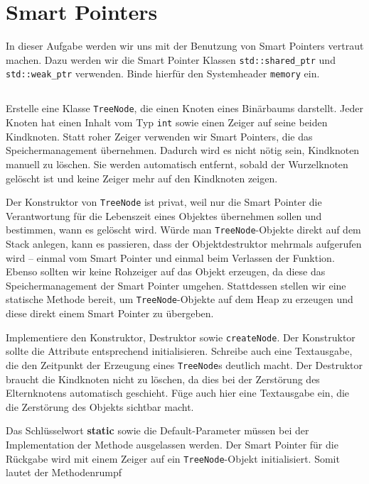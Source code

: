 \section{\ExercisePrefixMemory Smart Pointers}
In dieser Aufgabe werden wir uns mit der Benutzung von Smart Pointers vertraut machen. Dazu werden wir die Smart Pointer Klassen \lstinline{std::shared_ptr} und \lstinline{std::weak_ptr} verwenden. Binde hierfür den Systemheader \lstinline{memory} ein.


\subsection{}
Erstelle eine Klasse \lstinline{TreeNode}, die einen Knoten eines Binärbaums darstellt.
Jeder Knoten hat einen Inhalt vom Typ \lstinline{int} sowie einen Zeiger auf seine beiden Kindknoten.
Statt \glqq roher\grqq{} Zeiger verwenden wir Smart Pointers, die das Speichermanagement übernehmen.
Dadurch wird es nicht nötig sein, Kindknoten manuell zu löschen.
Sie werden automatisch entfernt, sobald der Wurzelknoten gelöscht ist und keine Zeiger mehr auf den Kindknoten zeigen.


Der Konstruktor von \lstinline{TreeNode} ist privat, weil nur die Smart Pointer die Verantwortung für die Lebenszeit eines Objektes übernehmen sollen und bestimmen, wann es gelöscht wird.
Würde man \lstinline{TreeNode}-Objekte direkt auf dem Stack anlegen, kann es passieren, dass der Objektdestruktor mehrmals aufgerufen wird -- einmal vom Smart Pointer und einmal beim Verlassen der Funktion.
Ebenso sollten wir keine Rohzeiger auf das Objekt erzeugen, da diese das Speichermanagement der Smart Pointer umgehen.
Stattdessen stellen wir eine statische Methode bereit, um \lstinline{TreeNode}-Objekte auf dem Heap zu erzeugen und diese direkt einem Smart Pointer zu übergeben.

Implementiere den Konstruktor, Destruktor sowie \lstinline{createNode}.
Der Konstruktor sollte die Attribute entsprechend initialisieren.
Schreibe auch eine Textausgabe, die den Zeitpunkt der Erzeugung eines \lstinline{TreeNode}s deutlich macht.
Der Destruktor braucht die Kindknoten nicht zu löschen, da dies bei der Zerstörung des Elternknotens automatisch geschieht.
Füge auch hier eine Textausgabe ein, die die Zerstörung des Objekts sichtbar macht.

Das Schlüsselwort \textbf{static} sowie die Default-Parameter müssen bei der Implementation der Methode ausgelassen werden.
Der Smart Pointer für die Rückgabe wird mit einem Zeiger auf ein \lstinline{TreeNode}-Objekt initialisiert. Somit lautet der Methodenrumpf

